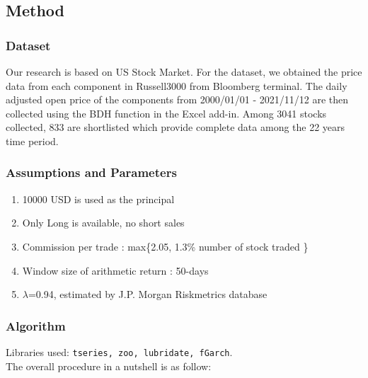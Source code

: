 \documentclass[11pt,a4paper]{article}
\begin{document}
    
    \subsection{Method}
    \subsubsection{Dataset}
    Our research is based on US Stock Market. For the dataset, we obtained the price data from each component in Russell3000 from Bloomberg terminal. The daily adjusted open price of the components from 2000/01/01 - 2021/11/12 are then collected using the BDH function in the Excel add-in. Among 3041 stocks collected, 833 are shortlisted which provide complete data among the 22 years time period.
    
    
    \subsubsection{Assumptions and Parameters}
    \begin{enumerate}
        \item 10000 USD is used as the principal
        \item Only Long is available, no short sales
        \item Commission per trade : max\{2.05, 1.3\% \texttimes{} number of stock traded \}
        \item Window size of arithmetic return : 50-days
        \item \(\lambda\)=0.94, estimated by J.P. Morgan Riskmetrics database %
    \end{enumerate}
    
    \subsubsection{Algorithm}
    Libraries used: \texttt{tseries, zoo, lubridate, fGarch}. \\
    
    \noindent
    The overall procedure in a nutshell is as follow:
\end{document}

